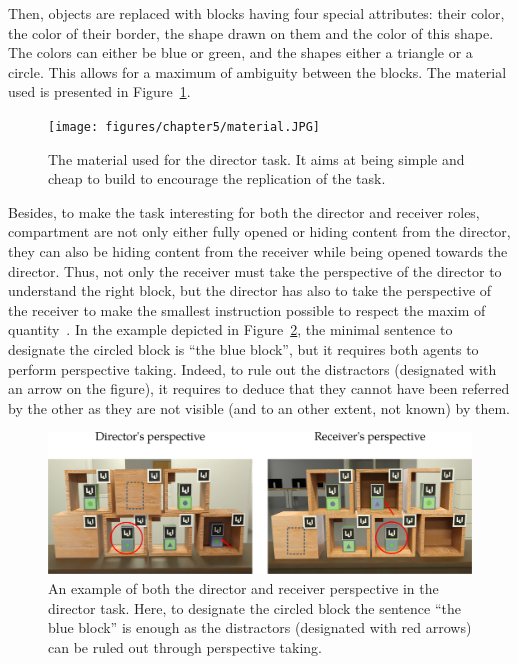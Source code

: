 \documentclass[a4paper,11pt,twoside]{StyleThese}
\begin{document}
Then, objects are replaced with blocks having four special attributes: their color, the color of their border, the shape drawn on them and the color of this shape. The colors can either be blue or green, and the shapes either a triangle or a circle. This allows for a maximum of ambiguity between the blocks. The material used is presented in Figure~\ref{fig:chap5material}.

\begin{figure}[hbtp]
\centering
\texttt{[image: figures/chapter5/material.JPG]}
\caption{The material used for the director task. It aims at being simple and cheap to build to encourage the replication of the task.}
\label{fig:chap5material}
\end{figure}

Besides, to make the task interesting for both the director and receiver roles, compartment are not only either fully opened or hiding content from the director, they can also be hiding content from the receiver while being opened towards the director. Thus, not only the receiver must take the perspective of the director to understand the right block, but the director has also to take the perspective of the receiver to make the smallest instruction possible to respect the maxim of quantity~\cite{grice1975logic}. In the example depicted in Figure~\ref{fig:chap5dtpersp}, the minimal sentence to designate the circled block is ``the blue block'', but it requires both agents to perform perspective taking. Indeed, to rule out the distractors (designated with an arrow on the figure), it requires to deduce that they cannot have been referred by the other as they are not visible (and to an other extent, not known) by them.

\begin{figure}[hbtp]
\centering
\includegraphics[width=\textwidth]{figures/chapter5/setup.png}
\caption{An example of both the director and receiver perspective in the director task. Here, to designate the circled block the sentence ``the blue block'' is enough as the distractors (designated with red arrows) can be ruled out through perspective taking.}
\label{fig:chap5dtpersp}
\end{figure}
\end{document}
